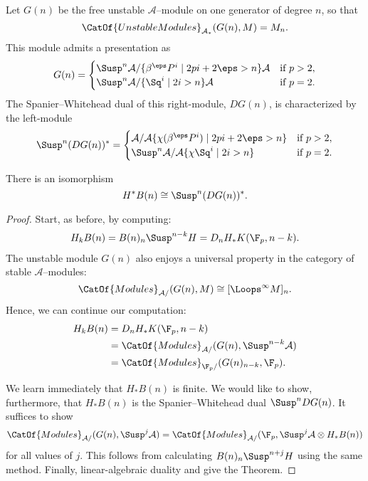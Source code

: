 \begin{definition}\label{SpanierWhiteheadDualOfGeneratingModule}
Let $G(n)$ be the free unstable $\mathcal A$--module on one generator of degree $n$, so that \[\CatOf{UnstableModules}_{\mathcal A_*}(G(n), M) = M_n.\]  This module admits a presentation as \[G(n) = \begin{cases} \Susp^n \mathcal A / \{\beta^\eps P^i \mid 2pi + 2\eps > n\}\mathcal A & \text{if $p > 2$}, \\ \Susp^n \mathcal A / \{\Sq^i \mid 2i > n\}\mathcal A & \text{if $p = 2$}. \end{cases}\]  The Spanier--Whitehead dual of this right-module, $DG(n)$, is characterized by the left-module \[\Susp^n (D G(n))^* = \begin{cases}\mathcal A / \mathcal A \{\chi(\beta^\eps P^i) \mid 2pi + 2\eps > n\} & \text{if $p > 2$}, \\ \Susp^n \mathcal A / \mathcal A \{\chi{\Sq^i} \mid 2i > n\} & \text{if $p = 2$}. \end{cases}\]
\end{definition}

\begin{theorem}
There is an isomorphism  \[H^* B(n) \cong \Susp^n(DG(n))^*.\]
\end{theorem}
\begin{proof}
Start, as before, by computing:
\begin{align*}
H_k B(n) = B(n)_n \Susp^{n-k} H = D_n H_* K(\F_p, n-k).
\end{align*}
The unstable module $G(n)$ also enjoys a universal property in the category of stable $\mathcal A$--modules: \[\CatOf{Modules}_{\mathcal A/}(G(n), M) \cong [\Loops^\infty M]_n.\]  Hence, we can continue our computation:
\begin{align*}
H_k B(n) & = D_n H_* K(\F_p, n-k) \\
& = \CatOf{Modules}_{\mathcal A/}(G(n), \Susp^{n-k} \mathcal A) \\
& = \CatOf{Modules}_{\F_p/}(G(n)_{n-k}, \F_p).
\end{align*}

We learn immediately that $H_* B(n)$ is finite.  We would like to show, furthermore, that $H_* B(n)$ is the Spanier--Whitehead dual $\Susp^n DG(n)$.  It suffices to show \[\CatOf{Modules}_{\mathcal A/}(G(n), \Susp^j \mathcal A) = \CatOf{Modules}_{\mathcal A/}(\F_p, \Susp^j \mathcal A \otimes H_* B(n))\] for all values of $j$.  This follows from calculating $B(n)_n \Susp^{n+j} H$ using the same method.  Finally, linear-algebraic duality and  give the Theorem.
\end{proof}

